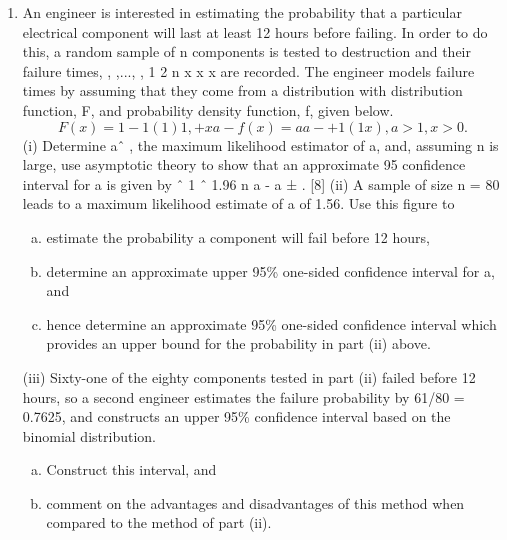 \documentclass[a4paper,12pt]{article}
\begin{document}
\begin{enumerate}
\begin{enumerate}[(a)]
\item Perform a one-way analysis of variance at the 5\% level to
compare the premiums for all four regions.
\item Present the new data in a simple diagram and hence comment
briefly on the validity of the assumptions required for the
analysis of variance.
\item Calculate a 95\% confidence interval for the underlying common
standard deviation $s$ of such premiums in the four regions. 
(iii) Comment briefly on your two confidence intervals in (i) and (ii)
above. 
\end{enumerate}

\newpage
\item  An engineer is interested in estimating the probability that a particular
electrical component will last at least 12 hours before failing. In order to do
this, a random sample of n components is tested to destruction and their
failure times, , ,..., , 1 2 n x x x are recorded. The engineer models failure times by
assuming that they come from a distribution with distribution function, F, and
probability density function, f, given below.
\[F(x) = 1 - 1
(1 ) 1
,
+ x a- f(x) = a
a
-
+
1
(1 x)
, a > 1, x > 0.\]
(i) Determine aˆ , the maximum likelihood estimator of a, and, assuming n
is large, use asymptotic theory to show that an approximate 95%
confidence interval for a is given by
ˆ 1 ˆ 1.96
n
a -
a ± . [8]
(ii) A sample of size n = 80 leads to a maximum likelihood estimate of a of
1.56. Use this figure to
\begin{enumerate}[(a)]
\item estimate the probability a component will fail before 12 hours,
\item determine an approximate upper 95\% one-sided confidence
interval for a, and
\item hence determine an approximate 95\% one-sided confidence
interval which provides an upper bound for the probability in
part (ii) above. 
\end{enumerate}
(iii) Sixty-one of the eighty components tested in part (ii) failed before 12
hours, so a second engineer estimates the failure probability by
61/80 = 0.7625, and constructs an upper 95\% confidence interval based
on the binomial distribution.
\begin{enumerate}[(a)]
\item Construct this interval, and
\item comment on the advantages and disadvantages of this method
when compared to the method of part (ii). 
\end{enumerate}



\end{enumerate}
\end{document}
